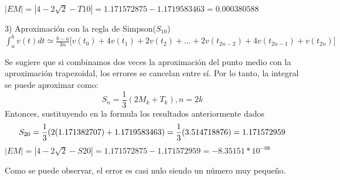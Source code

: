 $|EM | = | 4-2\sqrt{2} - T10 |= 1.171572875-1.1719583463=0.000380588$

3) Aproximación con la regla de Simpson($S_{10}$)\\
$\displaystyle\int_{a}^{b}v(t)dt\simeq \frac{b-a}{3n}\biggl[v(t_0)+4v(t_1)+2v(t_2)+\dotsc+2v(t_{2n-2})+4v(t_{2n-1})+v(t_{2n})\biggr]$

Se sugiere que si combinamos dos veces la aproximación del punto medio con la aproximación trapezoidal, los errores se cancelan entre sí.
Por lo tanto, la integral se puede aproximar como:
\[ S_n = \frac{1}{3} (2M_k + T_k),n=2k \]
Entonces, sustituyendo en la formula los resultados anteriormente dados
$$
S_{20}=\frac{1}{3} (2(1.171382707) + 1.1719583463) \\
	=\frac{1}{3}(3.514718876)\\
	=1.171572959$$
$|EM | = | 4-2\sqrt{2} - S20 |= 1.171572875-1.171572959=-8.35151*10^{-08}$

Como se puede observar, el error es casi nulo siendo un número muy pequeño.